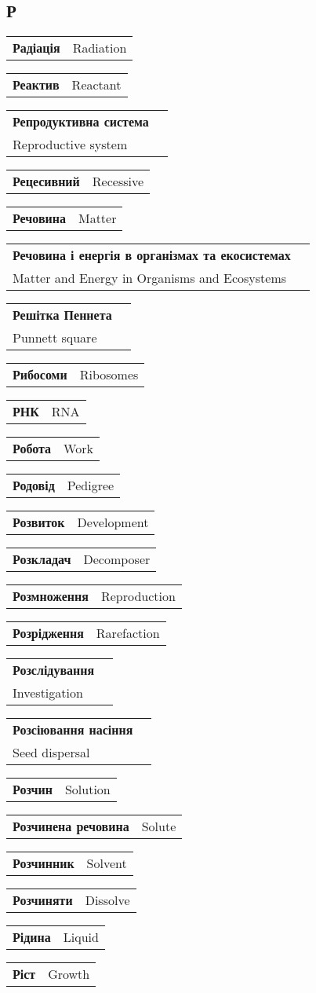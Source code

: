 \documentclass[a5paper,10pt]{book}
\makeatletter
\newcommand{\entry}[2]{%
  \noindent\begin{tabularx}{\linewidth}{@{}X@{}r@{}}
    \textbf{#1}\dotfill & #2 \\
  \end{tabularx}
}
\newcommand{\multientry}[3]{%
  \noindent\begin{tabularx}{\linewidth}{@{}X@{}r@{}}
    \textbf{#1}  \textbf{ #2} & \\[-0.5ex]
    \dotfill  #3 \\
  \end{tabularx}
}
\makeatother
\begin{document}
\begin{multicols}{2}
\section*{\textukrainian{Р}}
\entry{\textukrainian{Радіація}}{Radiation}
\entry{\textukrainian{Реактив}}{Reactant}
\multientry{\textukrainian{Репродуктивна система}}{}{Reproductive system}
\entry{\textukrainian{Рецесивний}}{Recessive}
\entry{\textukrainian{Речовина}}{Matter}
\multientry{\textukrainian{Речовина і енергія в організмах та екосистемах}}{}{Matter and Energy in Organisms and Ecosystems}
\multientry{\textukrainian{Решітка Пеннета }}{}{Punnett square}
\entry{\textukrainian{Рибосоми}}{Ribosomes}
\entry{\textukrainian{РНК}}{RNA}
\entry{\textukrainian{Робота}}{Work}
\entry{\textukrainian{Родовід}}{Pedigree}
\entry{\textukrainian{Розвиток}}{Development}
\entry{\textukrainian{Розкладач}}{Decomposer}
\entry{\textukrainian{Розмноження}}{Reproduction}
\entry{\textukrainian{Розрідження}}{Rarefaction}
\multientry{\textukrainian{Розслідування}}{}{Investigation}
\multientry{\textukrainian{Розсіювання насіння}}{}{Seed dispersal}
\entry{\textukrainian{Розчин}}{Solution}
\entry{\textukrainian{Розчинена речовина}}{Solute}
\entry{\textukrainian{Розчинник}}{Solvent}
\entry{\textukrainian{Розчиняти}}{Dissolve}
\entry{\textukrainian{Рідина}}{Liquid}
\entry{\textukrainian{Ріст}}{Growth}

\end{multicols}
\end{document}
